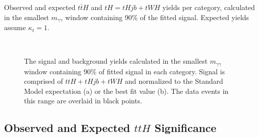 \begin{table}
\begin{center}
\end{center}
\vspace{-0.5cm}
\caption{Observed and expected $t\bar{t}H$ and $tH=tHjb+tWH$ yields per category, calculated in the smallest $m_{\gamma\gamma}$ window containing 90\% of the fitted signal. Expected yields assume $\kappa_{t}=1$.}
\label{tab:yields}
\end{table}

\begin{figure}[htbp]
  \centering
{}\\
    \caption{The signal and background yields calculated in the smallest $m_{\gamma\gamma}$ window containing 90\% of fitted signal in each category. Signal is comprised of $ttH+tHjb+tWH$ and normalized to the Standard Model expectation (a) or the best fit value (b). The data events in this range are overlaid in black points.
\label{fig:yields}}
\end{figure}



\subsection{Observed and Expected $ttH$ Significance}

